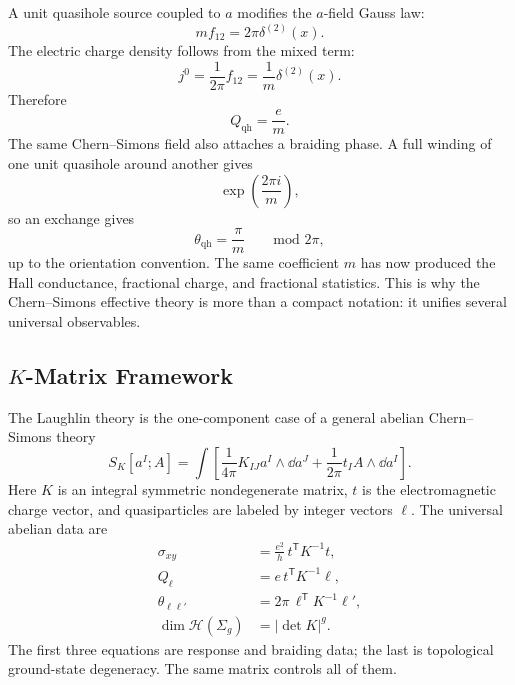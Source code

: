 A unit quasihole source coupled to $a$ modifies the $a$-field Gauss law:
\begin{equation}
  m f_{12}=2\pi\delta^{(2)}(x).
  \label{eq:anomaly-quasihole-flux}
\end{equation}
The electric charge density follows from the mixed term:
\begin{equation}
  j^0=\frac{1}{2\pi}f_{12}
  =
  \frac{1}{m}\delta^{(2)}(x).
  \label{eq:anomaly-quasihole-charge-density}
\end{equation}
Therefore
\begin{equation}
  Q_{\mathrm{qh}}=\frac{e}{m}.
  \label{eq:anomaly-quasihole-charge}
\end{equation}
The same Chern--Simons field also attaches a braiding phase. A full winding of one unit quasihole around another gives
\begin{equation}
  \exp\left(\frac{2\pi i}{m}\right),
  \label{eq:anomaly-full-braid}
\end{equation}
so an exchange gives
\begin{equation}
  \theta_{\mathrm{qh}}=\frac{\pi}{m}
  \qquad
  \text{mod }2\pi,
  \label{eq:anomaly-exchange-angle}
\end{equation}
up to the orientation convention. The same coefficient $m$ has now produced the Hall conductance, fractional charge, and fractional statistics. This is why the Chern--Simons effective theory is more than a compact notation: it unifies several universal observables.


\subsection{\texorpdfstring{$K$}{K}-Matrix Framework}
\label{subsec:k-matrix-framework}

The Laughlin theory is the one-component case of a general abelian Chern--Simons theory
\begin{equation}
  S_K[a^I;A]
  =
  \int\left[
  \frac{1}{4\pi}K_{IJ}a^I\wedge\dd a^J
  +
  \frac{1}{2\pi}t_I A\wedge\dd a^I
  \right].
  \label{eq:anomaly-k-matrix-action}
\end{equation}
Here $K$ is an integral symmetric nondegenerate matrix, $t$ is the electromagnetic charge vector, and quasiparticles are labeled by integer vectors $\ell$. The universal abelian data are
\begin{align}
  \sigma_{xy}
  &=
  \frac{e^2}{h}\,t^{\mathsf T}K^{-1}t,
  \label{eq:anomaly-k-hall}
  \\
  Q_\ell
  &=
  e\,t^{\mathsf T}K^{-1}\ell,
  \label{eq:anomaly-k-charge}
  \\
  \theta_{\ell\ell'}
  &=
  2\pi\,\ell^{\mathsf T}K^{-1}\ell',
  \label{eq:anomaly-k-mutual}
  \\
  \dim\mathcal H(\Sigma_g)
  &=
  |\det K|^g.
  \label{eq:anomaly-k-degeneracy}
\end{align}
The first three equations are response and braiding data; the last is topological ground-state degeneracy. The same matrix controls all of them.

